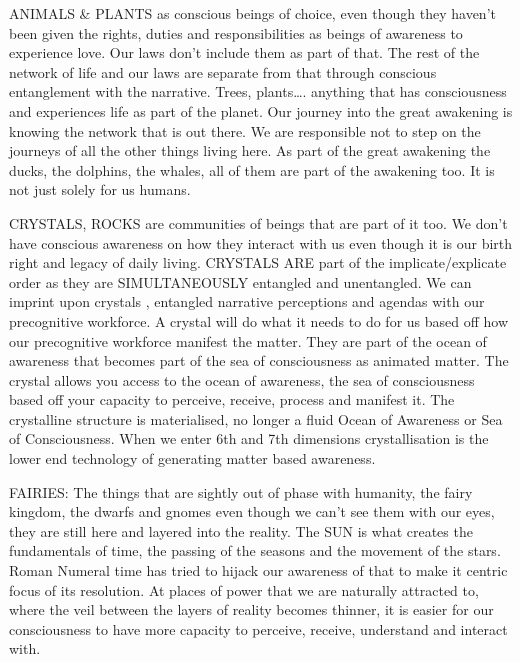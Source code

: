 ANIMALS \& PLANTS as conscious beings of choice, even though they
haven't been given the rights, duties and responsibilities as beings of
awareness to experience love. Our laws don't include them as part of
that. The rest of the network of life and our laws are separate from
that through conscious entanglement with the narrative. Trees,
plants\ldots{}. anything that has consciousness and experiences life as
part of the planet. Our journey into the great awakening is knowing the
network that is out there. We are responsible not to step on the
journeys of all the other things living here. As part of the great
awakening the ducks, the dolphins, the whales, all of them are part of
the awakening too. It is not just solely for us humans.

CRYSTALS, ROCKS are communities of beings that are part of it too. We
don't have conscious awareness on how they interact with us even though
it is our birth right and legacy of daily living. CRYSTALS ARE part of
the implicate/explicate order as they are SIMULTANEOUSLY entangled and
unentangled. We can imprint upon crystals , entangled narrative
perceptions and agendas with our precognitive workforce. A crystal will
do what it needs to do for us based off how our precognitive workforce
manifest the matter. They are part of the ocean of awareness that
becomes part of the sea of consciousness as animated matter. The crystal
allows you access to the ocean of awareness, the sea of consciousness
based off your capacity to perceive, receive, process and manifest it.
The crystalline structure is materialised, no longer a fluid Ocean of
Awareness or Sea of Consciousness. When we enter 6th and 7th dimensions
crystallisation is the lower end technology of generating matter based
awareness.

FAIRIES: The things that are sightly out of phase with humanity, the
fairy kingdom, the dwarfs and gnomes even though we can't see them with
our eyes, they are still here and layered into the reality. The SUN is
what creates the fundamentals of time, the passing of the seasons and
the movement of the stars. Roman Numeral time has tried to hijack our
awareness of that to make it centric focus of its resolution. At places
of power that we are naturally attracted to, where the veil between the
layers of reality becomes thinner, it is easier for our consciousness to
have more capacity to perceive, receive, understand and interact with.
